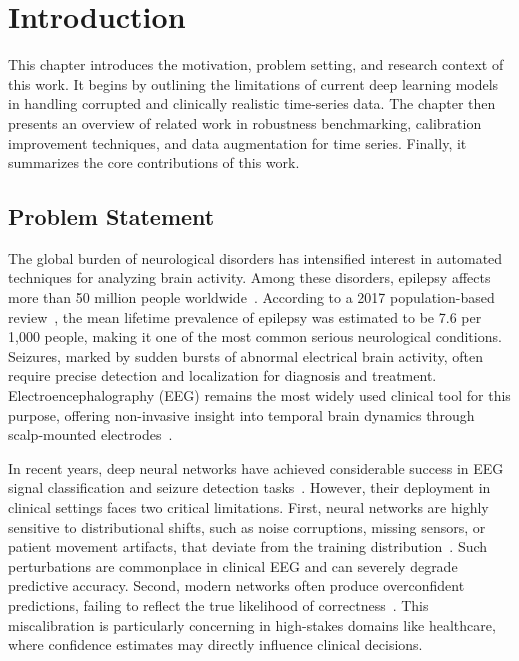 \chapter{Introduction}
\label{ch:introduction}

This chapter introduces the motivation, problem setting, and research context of this work. It begins by outlining the limitations of current deep learning models in handling corrupted and clinically realistic time-series data. The chapter then presents an overview of related work in robustness benchmarking, calibration improvement techniques, and data augmentation for time series. Finally, it summarizes the core contributions of this work.

\section{Problem Statement}

The global burden of neurological disorders has intensified interest in automated techniques for analyzing brain activity. Among these disorders, epilepsy affects more than 50 million people worldwide~\cite{whoEpilepsy}. According to a 2017 population-based review~\cite{thurman2011standards}, the mean lifetime prevalence of epilepsy was estimated to be 7.6 per 1,000 people, making it one of the most common serious neurological conditions. Seizures, marked by sudden bursts of abnormal electrical brain activity, often require precise detection and localization for diagnosis and treatment. Electroencephalography (EEG) remains the most widely used clinical tool for this purpose, offering non-invasive insight into temporal brain dynamics through scalp-mounted electrodes~\cite{niedermeyer2005}.

In recent years, deep neural networks have achieved considerable success in EEG signal classification and seizure detection tasks~\cite{schirrmeister2017deep, roy2019chrononet}. However, their deployment in clinical settings faces two critical limitations. First, neural networks are highly sensitive to distributional shifts, such as noise corruptions, missing sensors, or patient movement artifacts, that deviate from the training distribution~\cite{ovadia2019can, hendrycks2019benchmarking}. Such perturbations are commonplace in clinical EEG and can severely degrade predictive accuracy. Second, modern networks often produce overconfident predictions, failing to reflect the true likelihood of correctness~\cite{guo2017calibration}. This miscalibration is particularly concerning in high-stakes domains like healthcare, where confidence estimates may directly influence clinical decisions.

